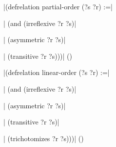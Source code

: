 \verbatim|(defrelation partial-order (?s ?r) :=|\par
\verbatim|  (and (irreflexive ?r ?s)|\par
\verbatim|       (asymmetric ?r ?s)|\par
\verbatim|       (transitive ?r ?s)))|
\hfill(\equation)\par
\bigskip
\verbatim|(defrelation linear-order (?s ?r) :=|\par
\verbatim|  (and (irreflexive ?r ?s)|\par
\verbatim|       (asymmetric ?r ?s)|\par
\verbatim|       (transitive ?r ?s)|\par
\verbatim|       (trichotomizes ?r ?s)))|
\hfill(\equation)\par

\bye


